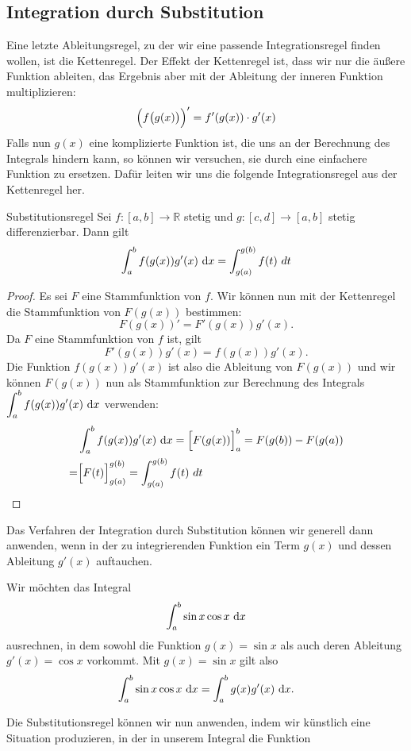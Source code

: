 \documentclass[../../main.tex]{subfiles}
\begin{document}
\subsection*{Integration durch Substitution}
\label{substitution}
Eine letzte Ableitungsregel, zu der wir eine passende Integrationsregel finden wollen, ist die Kettenregel. Der Effekt der
Kettenregel ist, dass wir nur die äußere Funktion ableiten, das Ergebnis aber mit der Ableitung der inneren Funktion multiplizieren:
\[\Bigl(f\bigl(g(x)\bigr)\Bigr)'=f'(g(x))\cdot g'(x)\]
Falls nun $g(x)$ eine komplizierte Funktion ist, die uns an der Berechnung des Integrals hindern kann, so können wir versuchen, 
sie durch eine einfachere Funktion zu ersetzen. Dafür leiten wir uns die folgende Integrationsregel aus der Kettenregel her.
\begin{theorem}{Substitutionsregel}
Sei $f:[a,b]\rightarrow\mathbb{R}$ stetig und $g:[c,d]\rightarrow[a,b]$ stetig differenzierbar. Dann gilt \[\int_a^b f(g(x))g'(x)\mathop{}\mathrm{d} x=\int_{g(a)}^{g(b)} f(t)~dt\]
\end{theorem}
\begin{proof}
Es sei $F$ eine Stammfunktion von $f$. Wir können nun mit der Kettenregel die Stammfunktion von $F(g(x))$ bestimmen: 
\[F(g(x))'=F'(g(x))g'(x).\]
Da $F$ eine Stammfunktion von $f$ ist, gilt 
\[F'(g(x))g'(x)=f(g(x))g'(x).\] 
Die Funktion $f(g(x))g'(x)$ ist also die Ableitung von $F(g(x))$ und wir können $F(g(x))$ nun als Stammfunktion zur 
Berechnung des Integrals
$\displaystyle\int_a^b f(g(x))g'(x)\mathop{}\mathrm{d} x$ verwenden:
\begin{align*}
    &\int_a^b f(g(x))g'(x)\mathop{}\mathrm{d} x=\Bigl[F(g(x))\Bigr]_a^b=F(g(b))-F(g(a))\\
    =&\Bigl[F(t)\Bigr]_{g(a)}^{g(b)}=\int_{g(a)}^{g(b)} f(t)~dt\qedhere
\end{align*}
\end{proof}
Das Verfahren der Integration durch Substitution können wir generell dann anwenden, wenn in der zu integrierenden 
Funktion ein Term $g(x)$ und dessen Ableitung $g'(x)$ auftauchen. 
\begin{example}{}
    Wir möchten das Integral
    \[\int_a^b\sin x\cos x\mathop{}\mathrm{d} x\]
    ausrechnen, in dem sowohl die Funktion $g(x)=\sin x$ als auch deren Ableitung $g'(x)=\cos x$ vorkommt. 
    Mit $g(x)=\sin x$ gilt also
    \[\int_a^b\sin x\cos x\mathop{}\mathrm{d} x=\int_a^bg(x)g'(x)\mathop{}\mathrm{d} x.\]
\end{example}
Die Substitutionsregel können wir nun anwenden, indem wir künstlich eine Situation produzieren, in der in unserem 
Integral die Funktion
\end{document}

